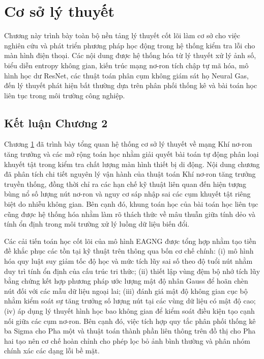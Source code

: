 \sloppy
\chapter{Cơ sở lý thuyết}
\label{chap:c2}

Chương này trình bày toàn bộ nền tảng lý thuyết cốt lõi làm cơ sở cho việc nghiên cứu và phát triển phương pháp học động trong hệ thống kiểm tra lỗi cho màn hình điện thoại. Các nội dung được hệ thống hóa từ lý thuyết xử lý ảnh số, biểu diễn entropy không gian, kiến trúc mạng nơ-ron tích chập tự mã hóa, mô hình học dư ResNet, các thuật toán phân cụm không giám sát họ Neural Gas, đến lý thuyết phát hiện bất thường dựa trên phân phối thống kê và bài toán học liên tục trong môi trường công nghiệp.









\section*{Kết luận Chương 2}

Chương \ref{chap:c2} đã trình bày tổng quan hệ thống cơ sở lý thuyết về mạng Khí nơ-ron tăng trưởng và các mở rộng toán học nhằm giải quyết bài toán tự động phân loại khuyết tật trong kiểm tra chất lượng màn hình thiết bị di động. Nội dung chương đã phân tích chi tiết nguyên lý vận hành của thuật toán Khí nơ-ron tăng trưởng truyền thống, đồng thời chỉ ra các hạn chế kỹ thuật liên quan đến hiện tượng bùng nổ số lượng nút nơ-ron và nguy cơ sáp nhập sai các cụm khuyết tật riêng biệt do nhiễu không gian. Bên cạnh đó, khung toán học của bài toán học liên tục cũng được hệ thống hóa nhằm làm rõ thách thức về mâu thuẫn giữa tính dẻo và tính ổn định trong môi trường xử lý luồng dữ liệu biến đổi.

Các cải tiến toán học cốt lõi của mô hình EAGNG được tổng hợp nhằm tạo tiền đề khắc phục các tồn tại kỹ thuật trên thông qua bốn cơ chế chính:
(i) mô hình hóa quy luật suy giảm tốc độ học và mức tích lũy sai số theo độ tuổi nút nhằm duy trì tính ổn định của cấu trúc tri thức;
(ii) thiết lập vùng đệm bộ nhớ tích lũy bằng chứng kết hợp phương pháp ước lượng mật độ nhân Gauss để hoãn chèn nút đối với các mẫu dữ liệu ngoại lai;
(iii) đánh giá mật độ không gian cục bộ nhằm kiểm soát sự tăng trưởng số lượng nút tại các vùng dữ liệu có mật độ cao;
(iv) áp dụng lý thuyết hình học bao không gian để kiểm soát điều kiện tạo cạnh nối giữa các cụm nơ-ron.
Bên cạnh đó, việc tích hợp quy tắc phân phối thống kê ba Sigma cho Pha một và thuật toán thành phần liên thông trên đồ thị cho Pha hai tạo nên cơ chế hoàn chỉnh cho phép lọc bỏ ảnh bình thường và phân nhóm chính xác các dạng lỗi bề mặt.


